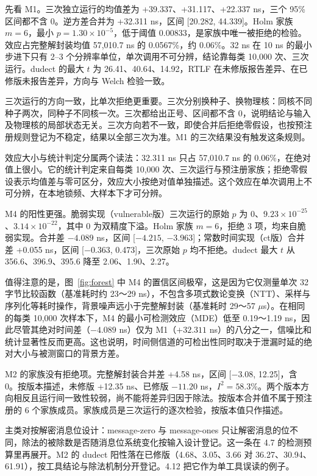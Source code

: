 先看 M1。三次独立运行的均值差为 +39.337、+31.117、+22.337 ns，三个 95\% 区间都不含 0。逆方差合并为 +32.311 ns，区间 [20.282, 44.339]。Holm 家族 $m=6$，最小 $p=1.30\times10^{-5}$，低于阈值 0.00833，是家族中唯一被拒绝的检验。效应占完整解封装均值 57,010.7 ns 的 0.0567\%，约 0.06\%。32 ns 在 10 ns 的最小步进下只有 2--3 个分辨率单位，单次调用不可分辨，结论靠每类 10,000 次、三次运行。dudect 的最大 $t$ 为 26.41、40.64、14.92，RTLF 在未修版报告差异、在已修版未报告差异，方向与 Welch 检验一致。%

三次运行的方向一致，比单次拒绝更重要。三次分别换种子、换物理核：同核不同种子两次，同种子不同核一次。三次都给出正号、区间都不含 0，说明结论与输入及物理核的局部状态无关。三次方向若不一致，即使合并后拒绝零假设，也按预注册规则登记为不稳定，结果以全部三次为准。M1 的三次结果没有触发这条规则。

效应大小与统计判定分属两个读法：32.311 ns 只占 57,010.7 ns 的 0.06\%，在绝对值上很小。它的统计判定来自每类 10,000 次、三次运行与预注册家族；拒绝零假设表示均值差与零可区分，效应大小按绝对值单独描述。这个效应在单次调用上不可分辨，在本地锁频、大样本下才可分辨。

M4 的阳性更强。脆弱实现（vulnerable版）三次运行的原始 $p$ 为 0、$9.23\times10^{-25}$、$3.14\times10^{-22}$，其中 0 为双精度下溢。Holm 家族 $m=6$，拒绝 3 项，均来自脆弱实现。合并差 $-4.089$ ns，区间 [$-4.215$, $-3.963$]；常数时间实现（ct版）合并差 +0.055 ns，区间 [$-0.363$, 0.473]，三次原始 $p$ 均不拒绝。dudect 最大 $t$ 从 356.6、396.9、395.6 降至 2.06、1.90、2.27。%

值得注意的是，图~\ref{fig:forest} 中 M4 的置信区间极窄，这是因为它仅测量单次 32 字节比较函数（基准耗时约 23～29 ns），不包含多项式数论变换（NTT）、采样与序列化等耗时操作，背景噪声远小于完整解封装（基准耗时 29～57 $\mu$s）。在相同的每类 10,000 次样本下，M4 的最小可检测效应（MDE）低至 0.19～1.19 ns，因此尽管其绝对时间差（$-4.089$ ns）仅为 M1（$+32.311$ ns）的八分之一，信噪比和统计显著性反而更高。这也说明，时间侧信道的可检出性同时取决于泄漏时延的绝对大小与被测窗口的背景方差。

M2 的家族没有拒绝项。完整解封装合并差 +4.58 ns，区间 [$-3.08$, 12.25]，含 0。按版本描述，未修版 +12.35 ns、已修版 $-11.20$ ns，$I^2=58.3\%$。两个版本方向相反且运行间一致性较弱，尚不能将差异归因于除法。按版本合并值不属于预注册的 6 个家族成员。家族成员是三次运行的逐次检验，按版本值只作描述。

主类对按解密消息位设计：message-zero 与 message-ones 只让解密消息的位不同，除法的被除数是否随消息位系统变化按输入设计登记。这一条在 4.7 的检测预算里再展开。M2 的 dudect 阳性落在已修版（4.68、3.05、3.66 对 36.27、30.94、61.91），按工具结论与除法机制分开登记。4.12 把它作为单工具误读的例子。%

